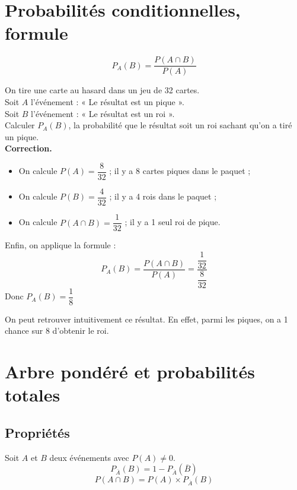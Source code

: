 \documentclass[11pt]{article}
\begin{document}
\section{Probabilités conditionnelles, formule}

\begin{propriete}
  $$P_A(B)=\dfrac{P(A \cap B)}{P(A)}$$
\end{propriete}

\begin{exercice}[0]
On tire une carte au hasard dans un jeu de 32 cartes. \\
Soit $A$ l'événement : « Le résultat est un pique ». \\
Soit $B$ l'événement : « Le résultat est un roi ». \\
Calculer $P_A(B)$, la probabilité que le résultat soit un roi sachant qu'on a tiré un pique.\\
\textbf{Correction.}
\begin{itemize}
\item On calcule $P(A)=\dfrac{8}{32}$ ; il y a 8 cartes piques dans le
  paquet ;
\item On calcule $P(B)=\dfrac{4}{32}$ ; il y a 4 rois dans le paquet ;
\item On calcule $P(A \cap B)=\dfrac{1}{32}$ ; il y a 1 seul roi de pique. 
\end{itemize}
Enfin, on applique la formule :
$$P_A(B)=\dfrac{P(A \cap B)}{P(A)}=\dfrac{\dfrac{1}{32}}{\dfrac{8}{32}}$$
Donc $P_A(B)=\dfrac{1}{8}$
\end{exercice}

\begin{remarque}
On peut retrouver intuitivement ce résultat. En effet, parmi les
piques, on a 1 chance sur 8 d'obtenir le roi.
\end{remarque}

\section{Arbre pondéré et probabilités totales}

\subsection{Propriétés}
\begin{propriete}
  Soit \( A \) et \( B \) deux événements avec \( P(A) \neq 0 \).
\[
P_{\overline{A}}(B) = 1 - P_{\overline{A}}(\overline{B})
\]
\[
P(A \cap B) = P(A) \times P_{\overline{A}}(B)
\]

\end{propriete}
\end{document}
